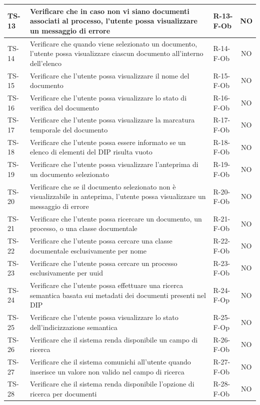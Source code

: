 \documentclass[a4paper,12pt]{article}
\begin{document}
\begin{longtable}{|p{1.5cm}|p{8.3cm}|p{2.4cm}|c|}
\hline
TS-13 & Verificare che in caso non vi siano documenti associati al processo, l'utente possa visualizzare un messaggio di errore & R-13-F-Ob & NO \\
\hline
TS-14 & Verificare che quando viene selezionato un documento, l'utente possa visualizzare ciascun documento all'interno dell'elenco & R-14-F-Ob & NO \\
\hline
TS-15 & Verificare che l'utente possa visualizzare il nome del documento & R-15-F-Ob & NO \\
\hline
TS-16 & Verificare che l'utente possa visualizzare lo stato di verifica del documento & R-16-F-Ob & NO \\
\hline
TS-17 & Verificare che l'utente possa visualizzare la marcatura temporale del documento & R-17-F-Ob & NO \\
\hline
TS-18 & Verificare che l'utente possa essere informato se un elenco di elementi del DIP risulta vuoto & R-18-F-Ob & NO \\
\hline
TS-19 & Verificare che l'utente possa visualizzare l'anteprima di un documento selezionato & R-19-F-Ob & NO \\
\hline
TS-20 & Verificare che se il documento selezionato non è visualizzabile in anteprima, l'utente possa visualizzare un messaggio di errore & R-20-F-Ob & NO \\
\hline
TS-21 & Verificare che l'utente possa ricercare un documento, un processo, o una classe documentale & R-21-F-Ob & NO \\
\hline
TS-22 & Verificare che l'utente possa cercare una classe documentale esclusivamente per nome & R-22-F-Ob & NO \\
\hline
TS-23 & Verificare che l'utente possa cercare un processo esclusivamente per uuid & R-23-F-Ob & NO \\
\hline
TS-24 & Verificare che l'utente possa effettuare una ricerca semantica basata sui metadati dei documenti presenti nel DIP & R-24-F-Op & NO \\
\hline
TS-25 & Verificare che l'utente possa visualizzare lo stato dell'indicizzazione semantica & R-25-F-Op & NO \\
\hline
TS-26 & Verificare che il sistema renda disponibile un campo di ricerca & R-26-F-Ob & NO \\
\hline
TS-27 & Verificare che il sistema comunichi all'utente quando inserisce un valore non valido nel campo di ricerca & R-27-F-Ob & NO \\
\hline
TS-28 & Verificare che il sistema renda disponibile l'opzione di ricerca per documenti & R-28-F-Ob & NO \\

\end{longtable}
\end{document}
